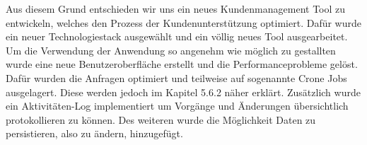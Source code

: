 Aus diesem Grund entschieden wir uns ein neues Kundenmanagement Tool zu entwickeln, welches den Prozess der Kundenunterstützung optimiert. Dafür wurde ein neuer Technologiestack ausgewählt und ein völlig neues Tool ausgearbeitet. Um die Verwendung der Anwendung so angenehm wie möglich zu gestallten wurde eine neue Benutzeroberfläche erstellt und die Performanceprobleme gelöst. Dafür wurden die Anfragen optimiert und teilweise auf sogenannte Crone Jobs ausgelagert. Diese werden jedoch im Kapitel 5.6.2 näher erklärt.
\newline
Zusätzlich wurde ein Aktivitäten-Log implementiert um Vorgänge und Änderungen übersichtlich protokollieren zu können. Des weiteren wurde die Möglichkeit Daten zu persistieren, also zu ändern, hinzugefügt.